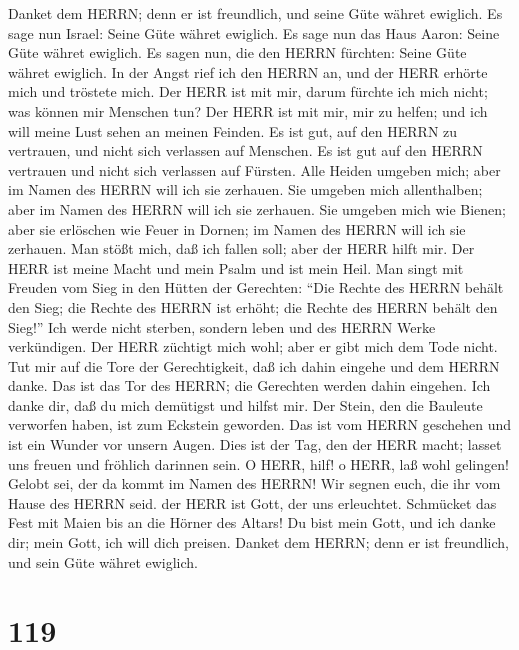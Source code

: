  Danket dem HERRN; denn er ist freundlich, und seine Güte
währet ewiglich.  Es sage nun Israel: Seine Güte währet
ewiglich.  Es sage nun das Haus Aaron: Seine Güte währet
ewiglich.  Es sagen nun, die den HERRN fürchten: Seine Güte
währet ewiglich.  In der Angst rief ich den HERRN an, und
der HERR erhörte mich und tröstete mich.  Der HERR ist mit
mir, darum fürchte ich mich nicht; was können mir Menschen tun?
 Der HERR ist mit mir, mir zu helfen; und ich will meine
Lust sehen an meinen Feinden.  Es ist gut, auf den HERRN zu
vertrauen, und nicht sich verlassen auf Menschen.  Es ist
gut auf den HERRN vertrauen und nicht sich verlassen auf Fürsten.
 Alle Heiden umgeben mich; aber im Namen des HERRN will ich
sie zerhauen.  Sie umgeben mich allenthalben; aber im Namen
des HERRN will ich sie zerhauen.  Sie umgeben mich wie
Bienen; aber sie erlöschen wie Feuer in Dornen; im Namen des HERRN will
ich sie zerhauen.  Man stößt mich, daß ich fallen soll;
aber der HERR hilft mir.  Der HERR ist meine Macht und mein
Psalm und ist mein Heil.  Man singt mit Freuden vom Sieg in
den Hütten der Gerechten: ``Die Rechte des HERRN behält den Sieg;
 die Rechte des HERRN ist erhöht; die Rechte des HERRN
behält den Sieg!''  Ich werde nicht sterben, sondern leben
und des HERRN Werke verkündigen.  Der HERR züchtigt mich
wohl; aber er gibt mich dem Tode nicht.  Tut mir auf die
Tore der Gerechtigkeit, daß ich dahin eingehe und dem HERRN danke.
 Das ist das Tor des HERRN; die Gerechten werden dahin
eingehen.  Ich danke dir, daß du mich demütigst und hilfst
mir.  Der Stein, den die Bauleute verworfen haben, ist zum
Eckstein geworden.  Das ist vom HERRN geschehen und ist ein
Wunder vor unsern Augen.  Dies ist der Tag, den der HERR
macht; lasset uns freuen und fröhlich darinnen sein.  O
HERR, hilf! o HERR, laß wohl gelingen!  Gelobt sei, der da
kommt im Namen des HERRN! Wir segnen euch, die ihr vom Hause des HERRN
seid.  der HERR ist Gott, der uns erleuchtet. Schmücket das
Fest mit Maien bis an die Hörner des Altars!  Du bist mein
Gott, und ich danke dir; mein Gott, ich will dich preisen. 
Danket dem HERRN; denn er ist freundlich, und sein Güte währet ewiglich.

\hypertarget{section-118}{%
\section{119}\label{section-118}}

